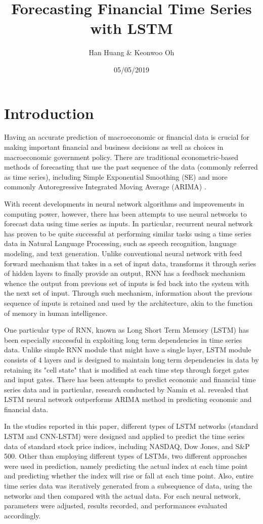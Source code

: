 \documentclass[12pt]{article}
\title{Forecasting Financial Time Series with LSTM\\}
\author{Han Huang \& Keonwoo Oh}
\date{05/05/2019}
\begin{document}
\maketitle

\section{Introduction}
Having an accurate prediction of macroeconomic or financial data is crucial for making important financial and business decisions as well as choices in macroeconomic government policy. There are traditional econometric-based methods of forecasting that use the past sequence of the data (commonly referred as time series), including Simple Exponential Smoothing (SE) and more commonly Autoregressive Integrated Moving Average (ARIMA) \cite{1}.

With recent developments in neural network algorithms and improvements in computing power, however, there has been attempts to use neural networks to forecast data using time series as inputs. In particular, recurrent neural network has proven to be quite successful at performing similar tasks using a time series data in Natural Language Processing, such as speech recognition, language modeling, and text generation\cite{1}. Unlike conventional neural network with feed forward mechanism that takes in a set of input data, transforms it through series of hidden layers to finally provide an output, RNN has a feedback mechanism whence the output from previous set of inputs is fed back into the system with the next set of input\cite{2}. Through such mechanism, information about the previous sequence of inputs is retained and used by the architecture, akin to the function of memory in human intelligence.

One particular type of RNN, known as Long Short Term Memory (LSTM) has been especially successful in exploiting long term dependencies in time series data. Unlike simple RNN module that might have a single layer, LSTM module consists of 4 layers and is designed to maintain long term dependencies in data by retaining its "cell state" that is modified at each time step through forget gates and input gates\cite{2}. There has been attempts to predict economic and financial time series data and in particular, research conducted by Namin et al. revealed that LSTM neural network outperforms ARIMA method in predicting economic and financial data\cite{3}.

In the studies reported in this paper, different types of LSTM networks (standard LSTM and CNN-LSTM) were designed and applied to predict the time series data of standard stock price indices, including NASDAQ, Dow Jones, and S\&P 500. Other than employing different types of LSTMs, two different approaches were used in prediction, namely predicting the actual index at each time point and predicting whether the index will rise or fall at each time point. Also, entire time series data was iteratively generated from a subsequence of data, using the networks and then compared with the actual data. For each neural network, parameters were adjusted, results recorded, and performances evaluated accordingly.
\end{document}
